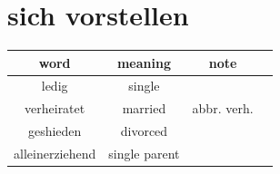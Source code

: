 \section{sich vorstellen}
\begin{center}
    \begin{tabular} {|c|c|c|c|}
        \hline
        \rowcolor{gray}
        word            & meaning       & note        \\
        \hline
        ledig           & single        &             \\
        verheiratet     & married       & abbr. verh. \\
        geshieden       & divorced      &             \\
        alleinerziehend & single parent &             \\
        \hline
    \end{tabular}
\end{center}

